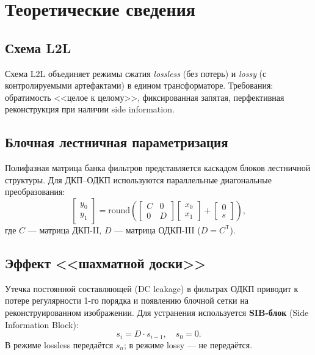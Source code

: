 \documentclass[12pt,a4paper]{article}
\begin{document}
\section{Теоретические сведения}

\subsection{Схема L2L}

Схема L2L объединяет режимы сжатия \textit{lossless} (без потерь) и \textit{lossy} (с контролируемыми артефактами) в едином трансформаторе. Требования: обратимость <<целое к целому>>, фиксированная запятая, перфективная реконструкция при наличии side information.

\subsection{Блочная лестничная параметризация}

Полифазная матрица банка фильтров представляется каскадом блоков лестничной структуры. Для ДКП--ОДКП используются параллельные диагональные преобразования:
\begin{equation}
\begin{bmatrix} y_0 \\ y_1 \end{bmatrix}
=
\mathrm{round}\left(
\begin{bmatrix} C & 0 \\ 0 & D \end{bmatrix}
\begin{bmatrix} x_0 \\ x_1 \end{bmatrix}
+
\begin{bmatrix} 0 \\ s \end{bmatrix}
\right),
\end{equation}
где $C$ --- матрица ДКП-II, $D$ --- матрица ОДКП-III ($D = C^\mathsf{T}$).

\subsection{Эффект <<шахматной доски>>}

Утечка постоянной составляющей (DC leakage) в фильтрах ОДКП приводит к потере регулярности 1-го порядка и появлению блочной сетки на реконструированном изображении. Для устранения используется \textbf{SIB-блок} (Side Information Block):
\begin{equation}
s_i = D \cdot s_{i-1}, \quad s_0 = 0.
\end{equation}
В режиме lossless передаётся $s_n$; в режиме lossy --- не передаётся.
\end{document}
